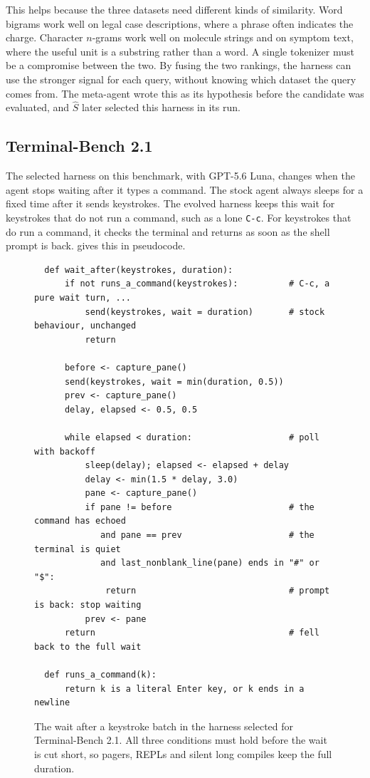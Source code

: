 \documentclass{article} %
\begin{document}
This helps because the three datasets need different kinds of similarity. Word
bigrams work well on legal case descriptions, where a phrase often indicates the
charge. Character $n$-grams work well on molecule strings and on symptom text,
where the useful unit is a substring rather than a word. A single tokenizer must
be a compromise between the two. By fusing the two rankings, the harness can use
the stronger signal for each query, without knowing which dataset the query comes
from. The meta-agent wrote this as its hypothesis before the candidate was
evaluated, and $\hat{S}$ later selected this harness in its run.

\subsection{Terminal-Bench 2.1}

The selected harness on this benchmark, with GPT-5.6 Luna, changes when the agent
stops waiting after it types a command. The stock agent always sleeps for a fixed
time after it sends keystrokes. The evolved harness keeps this wait for keystrokes
that do not run a command, such as a lone \texttt{C-c}. For keystrokes that do run
a command, it checks the terminal and returns as soon as the shell prompt is back.
 gives this in pseudocode.

\begin{figure}[ht]
\small
\begin{verbatim}
  def wait_after(keystrokes, duration):
      if not runs_a_command(keystrokes):          # C-c, a pure wait turn, ...
          send(keystrokes, wait = duration)       # stock behaviour, unchanged
          return

      before <- capture_pane()
      send(keystrokes, wait = min(duration, 0.5))
      prev <- capture_pane()
      delay, elapsed <- 0.5, 0.5

      while elapsed < duration:                   # poll with backoff
          sleep(delay); elapsed <- elapsed + delay
          delay <- min(1.5 * delay, 3.0)
          pane <- capture_pane()
          if pane != before                       # the command has echoed
             and pane == prev                     # the terminal is quiet
             and last_nonblank_line(pane) ends in "#" or "$":
              return                              # prompt is back: stop waiting
          prev <- pane
      return                                      # fell back to the full wait

  def runs_a_command(k):
      return k is a literal Enter key, or k ends in a newline
\end{verbatim}
\vspace{-6pt}
\caption{The wait after a keystroke batch in the harness selected for
Terminal-Bench 2.1. All three conditions must hold before the wait is cut short,
so pagers, REPLs and silent long compiles keep the full duration.}
\label{fig:code_tb}
\end{figure}
\end{document}
